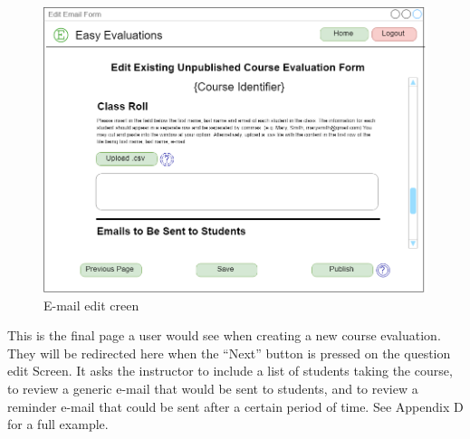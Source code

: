 \documentclass{article}
\begin{document}
\newpage

\begin{center}
\begin{figure}[H]
    \centering
    \caption{E-mail edit creen}
    \includegraphics[width=6.5in]{images/emails_screen.png}
\end{figure}
\end{center}

This is the final page a user would see when creating a new course evaluation. They will be redirected here when the ``Next'' button is pressed on the question edit Screen. It asks the instructor to include a list of students taking the course, to review a generic e-mail that would be sent to students, and to review a reminder e-mail that could be sent after a certain period of time. See Appendix D for a full example.

\newpage
\end{document}
